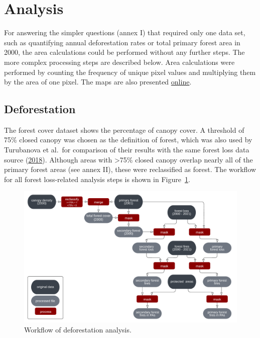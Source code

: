 \documentclass[
  letterpaper,
  DIV=11,
  numbers=noendperiod]{scrreprt}
\begin{document}
\hypertarget{analysis}{%
\section{Analysis}\label{analysis}}

For answering the simpler questions (annex I) that required only one
data set, such as quantifying annual deforestation rates or total
primary forest area in 2000, the area calculations could be performed
without any further steps. The more complex processing steps are
described below. Area calculations were performed by counting the
frequency of unique pixel values and multiplying them by the area of one
pixel. The maps are also presented
\href{https://storymaps.arcgis.com/stories/4594866b4f414b8aa7571325336db771}{online}.

\hypertarget{deforestation}{%
\subsection{Deforestation}\label{deforestation}}

The forest cover dataset shows the percentage of canopy cover. A
threshold of 75\% closed canopy was chosen as the definition of forest,
which was also used by Turubanova et al.~for comparison of their results
with the same forest loss data source
(\protect\hyperlink{ref-turubanovaOngoingPrimaryForest2018}{2018}).
Although areas with \textgreater75\% closed canopy overlap nearly all of
the primary forest areas (see annex II), these were reclassified as
forest. The workflow for all forest loss-related analysis steps is shown
in Figure~\ref{fig-wf_deforestation}.

\begin{figure}[H]

{\centering \includegraphics{text/05_method_files/wf_deforestation.png}

}

\caption{\label{fig-wf_deforestation}Workflow of deforestation
analysis.}

\end{figure}
\end{document}
